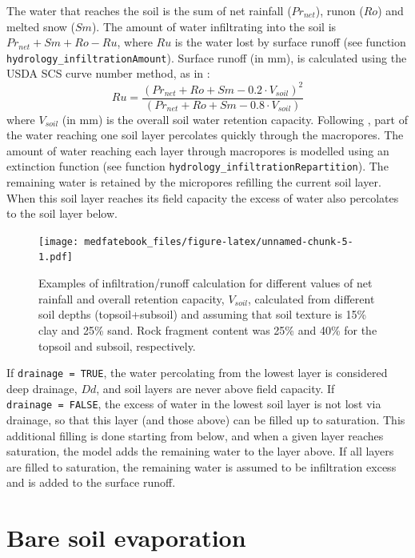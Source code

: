 \documentclass[]{book}
\begin{document}
The water that reaches the soil is the sum of net rainfall (\(Pr_{net}\)), runon (\(Ro\)) and melted snow (\(Sm\)). The amount of water infiltrating into the soil is \(Pr_{net} + Sm + Ro - Ru\), where \(Ru\) is the water lost by surface runoff (see function \texttt{hydrology\_infiltrationAmount}). Surface runoff (in mm), is calculated using the USDA SCS curve number method, as in \citet{Boughton1989}:
\begin{equation}
Ru=\frac{(Pr_{net} + Ro + Sm - 0.2 \cdot V_{soil})^2}{(Pr_{net} + Ro + Sm - 0.8 \cdot V_{soil})}
\end{equation}
where \(V_{soil}\) (in mm) is the overall soil water retention capacity. Following \citet{Granier1999}, part of the water reaching one soil layer percolates quickly through the macropores. The amount of water reaching each layer through macropores is modelled using an extinction function (see function \texttt{hydrology\_infiltrationRepartition}). The remaining water is retained by the micropores refilling the current soil layer. When this soil layer reaches its field capacity the excess of water also percolates to the soil layer below.

\begin{figure}
\centering
\texttt{[image: medfatebook\_files/figure-latex/unnamed-chunk-5-1.pdf]}
\caption{\label{fig:unnamed-chunk-5}Examples of infiltration/runoff calculation for different values of net rainfall and overall retention capacity, \(V_{soil}\), calculated from different soil depths (topsoil+subsoil) and assuming that soil texture is 15\% clay and 25\% sand. Rock fragment content was 25\% and 40\% for the topsoil and subsoil, respectively.}
\end{figure}

If \texttt{drainage\ =\ TRUE}, the water percolating from the lowest layer is considered deep drainage, \(Dd\), and soil layers are never above field capacity. If \texttt{drainage\ =\ FALSE}, the excess of water in the lowest soil layer is not lost via drainage, so that this layer (and those above) can be filled up to saturation. This additional filling is done starting from below, and when a given layer reaches saturation, the model adds the remaining water to the layer above. If all layers are filled to saturation, the remaining water is assumed to be infiltration excess and is added to the surface runoff.

\hypertarget{soilevaporation}{%
\section{Bare soil evaporation}\label{soilevaporation}}
\end{document}
